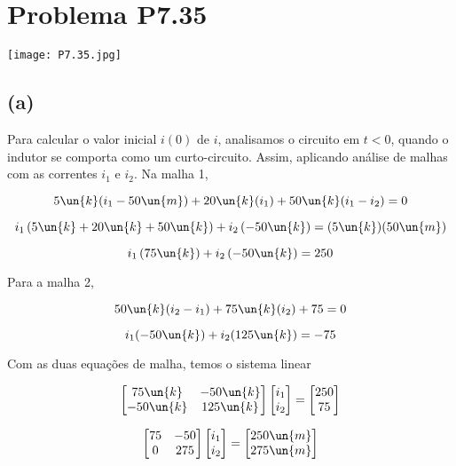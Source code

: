 
\section*{Problema P7.35}

\renewcommand*\thesection{7.35}

\begin{center}
    \texttt{[image: P7.35.jpg]}
\end{center}

\subsection*{(a)}

Para calcular o valor inicial $i(0)$ de $i$, analisamos o circuito em $t<0$, quando o indutor se comporta como um curto-circuito.
Assim, aplicando análise de malhas com as correntes $i_1$ e $i_2$. Na malha 1,

\[ 5\un{k}(i_1 - 50\un{m}) + 20\un{k}(i_1) + 50\un{k}(i_1 - i_2) = 0 \]

\[ i_1\left(5\un{k} + 20\un{k} + 50\un{k}\right) + i_2\left(- 50\un{k}\right) = ( 5\un{k})(50\un{m}) \]

\[ i_1\left(75\un{k}\right) + i_2\left(- 50\un{k}\right) = 250 \]

Para a malha 2,   

\[ 50\un{k}(i_2 - i_1) + 75\un{k}(i_2) + 75 = 0 \]

\[ i_1(-50\un{k}) + i_2(125\un{k}) = -75 \]

Com as duas equações de malha, temos o sistema linear   

\begingroup
\renewcommand*{\arraystretch}{1.5}

\[
    \begin{bmatrix}
        75\un{k} & -50\un{k}   \\
        -50\un{k}    & 125\un{k}
    \end{bmatrix}
    \begin{bmatrix}
        i_1 \\
        i_2
    \end{bmatrix}
    =
    \begin{bmatrix}
        250 \\
        75
    \end{bmatrix}
\]

\[
    \begin{bmatrix}
        75 & -50   \\
        0    & 275
    \end{bmatrix}
    \begin{bmatrix}
        i_1 \\
        i_2
    \end{bmatrix}
    =
    \begin{bmatrix}
        250\un{m} \\
        275\un{m}
    \end{bmatrix}
\]


